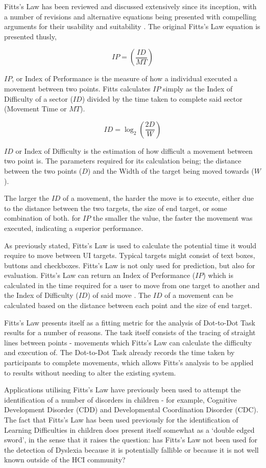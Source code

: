 			Fitts’s Law has been reviewed and discussed extensively since its inception, with a number of revisions and alternative equations being presented with compelling arguments for their usability and suitability \cite{MacKenzie1992, MacKenzie1995}. The original Fitts’s Law equation is presented thusly,

			\[IP = \left(\frac{ID}{MT}\right)\]
		
			\(IP\), or Index of Performance is the measure of how a individual executed a movement between two points. Fitts calculates \(IP\) simply as the Index of Difficulty of a sector (\(ID\)) divided by the time taken to complete said sector (Movement Time or \(MT\)).
			
			\[ID = \log_2\left( \frac{2D}{W}\right)\]
			
			\(ID\) or Index of Difficulty is the estimation of how difficult a movement between two point is. The parameters required for its calculation being; the distance between the two points (\(D\)) and the Width of the target being moved towards (\(W\)).
			
			The larger the \(ID\) of a movement, the harder the move is to execute, either due to the distance between the two targets, the size of end target, or some combination of both. for \(IP\) the smaller the value, the faster the movement was executed, indicating a superior performance. 
			
			As previously stated, Fitts’s Law is used to calculate the potential time it would require to move between UI targets. Typical targets might consist of text boxes, buttons and checkboxes. Fitts’s Law is not only used for prediction, but also for evaluation. Fitts’s Law can return an Index of Performance (\(IP\)) which is calculated in the time required for a user to move from one target to another and the Index of Difficulty (\(ID\)) of said move \cite{Fitts1954}.  The \(ID\) of a movement can be calculated based on the distance between each point and the size of end target.

			Fitts’s Law presents itself as a fitting metric for the analysis of Dot-to-Dot Task results for a number of reasons. The task itself consists of the tracing of straight lines between points  - movements which Fitts’s Law can calculate the difficulty and execution of. The Dot-to-Dot Task already records the time taken by participants to complete movements, which allows Fitts’s analysis to be applied to results without needing to alter the existing system.

			Applications utilising Fitts’s Law have previously been used to attempt the identification of a number of disorders in children - for example, Cognitive Development Disorder (CDD) and Developmental Coordination Disorder (CDC). The fact that Fitts’s Law has been used previously for the identification of Learning Difficulties in children does present itself somewhat as a ‘double edged sword’, in the sense that it raises the question: has Fitts’s Law not been used for the detection of Dyslexia because it is potentially fallible or because it is not well known outside of the HCI community?
		
